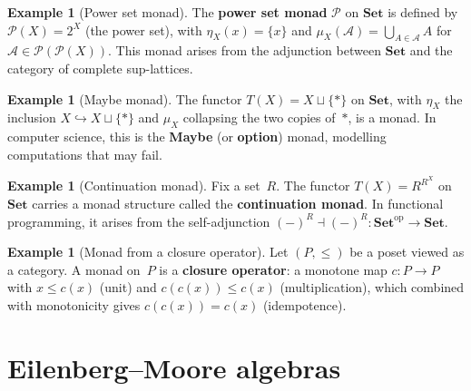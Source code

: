 \documentclass[a4paper,12pt]{book}
\newcommand{\Set}{\mathbf{Set}}
\newcommand{\op}{\mathrm{op}}
\theoremstyle{definition}
\newtheorem{example}[definition]{Example}
\theoremstyle{plain}
\theoremstyle{remark}
\begin{document}
\begin{example}[Power set monad]\label{ex:monad-powerset}
The \textbf{power set monad} $\mathcal{P}$ on $\Set$ is defined by
$\mathcal{P}(X) = 2^X$ (the power set), with
$\eta_X(x) = \{x\}$ and $\mu_X(\mathcal{A}) = \bigcup_{A\in\mathcal{A}} A$
for $\mathcal{A}\in\mathcal{P}(\mathcal{P}(X))$.
This monad arises from the adjunction between $\Set$ and the category
of complete sup-lattices.
\end{example}

\begin{example}[Maybe monad]\label{ex:monad-maybe}
The functor $T(X) = X\sqcup\{*\}$ on $\Set$, with $\eta_X$ the
inclusion $X\hookrightarrow X\sqcup\{*\}$ and $\mu_X$ collapsing
the two copies of~$*$, is a monad.  In computer science, this is the
\textbf{Maybe} (or \textbf{option}) monad, modelling computations that
may fail.
\end{example}

\begin{example}[Continuation monad]\label{ex:monad-continuation}
Fix a set~$R$.  The functor $T(X) = R^{R^X}$ on $\Set$ carries a
monad structure called the \textbf{continuation monad}.
In functional programming, it arises from the self-adjunction
$(-)^R\dashv(-)^R\colon\Set^{\op}\to\Set$.
\end{example}

\begin{example}[Monad from a closure operator]\label{ex:monad-closure}
Let $(P,\leq)$ be a poset viewed as a category.  A monad on~$P$ is a
\textbf{closure operator}: a monotone map $c\colon P\to P$ with
$x\leq c(x)$ (unit) and $c(c(x))\leq c(x)$ (multiplication), which
combined with monotonicity gives $c(c(x)) = c(x)$ (idempotence).
\end{example}


\section{Eilenberg--Moore algebras}\label{sec:em-algebras}
\end{document}
